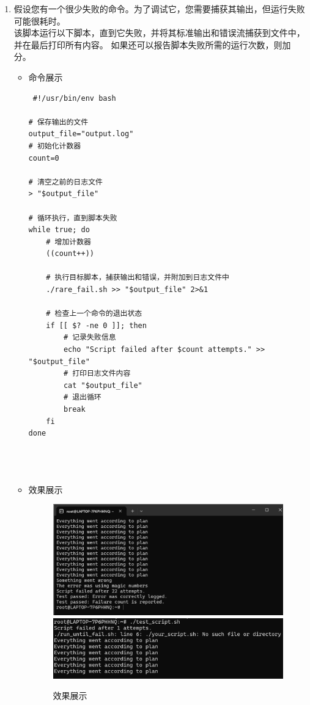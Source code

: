 \documentclass[UTF8]{ctexart}
\begin{document}
\begin{enumerate}
  \item  假设您有一个很少失败的命令。为了调试它，您需要捕获其输出，但运行失败可能很耗时。\\该脚本运行以下脚本，直到它失败，并将其标准输出和错误流捕获到文件中，并在最后打印所有内容。 如果还可以报告脚本失败所需的运行次数，则加分。
  \begin{itemize}
  \item 命令展示
  \begin{verbatim}
 #!/usr/bin/env bash

# 保存输出的文件
output_file="output.log"
# 初始化计数器
count=0

# 清空之前的日志文件
> "$output_file"

# 循环执行，直到脚本失败
while true; do
    # 增加计数器
    ((count++))
    
    # 执行目标脚本，捕获输出和错误，并附加到日志文件中
    ./rare_fail.sh >> "$output_file" 2>&1
    
    # 检查上一个命令的退出状态
    if [[ $? -ne 0 ]]; then
        # 记录失败信息
        echo "Script failed after $count attempts." >> "$output_file"
        # 打印日志文件内容
        cat "$output_file"
        # 退出循环
        break
    fi
done


    
  \end{verbatim}

  \item 效果展示
  \begin{figure}[H]
    \centering
    \includegraphics[width=\textwidth]{2} %
     \includegraphics[width=\textwidth]{3} %
    \caption{效果展示}
  
  \end{figure}
\end{itemize}
\end{enumerate}
\end{document}

